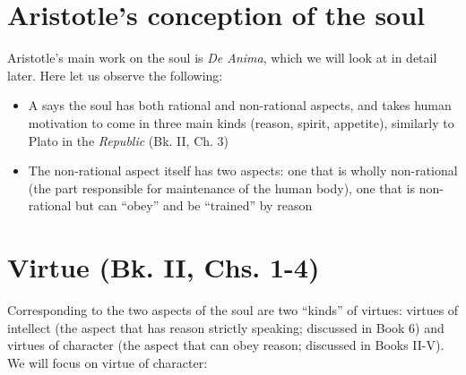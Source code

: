 \documentclass[oneside]{article}
\begin{document}
\thispagestyle{fancy}

\section*{Aristotle's conception of the soul}

Aristotle's main work on the soul is \emph{De Anima}, which we will look at in detail later. Here let us observe the following: 

\begin{itemize}
\item A says the soul has both rational and non-rational aspects, and takes human motivation to come in three main kinds (reason, spirit, appetite), similarly to Plato in the \emph{Republic}  (Bk. II, Ch. 3)

\item The non-rational aspect itself has two aspects: one that is wholly non-rational (the part responsible for maintenance of the human body), one that is non-rational but can ``obey'' and be ``trained'' by reason
\end{itemize}

\section*{Virtue (Bk. II, Chs. 1-4)}

Corresponding to the two aspects of the soul are two ``kinds'' of virtues: virtues of intellect (the aspect that has reason strictly speaking; discussed in Book 6) and virtues of character (the aspect that can obey reason; discussed in Books II-V). We will focus on virtue of character: 
\end{document}
